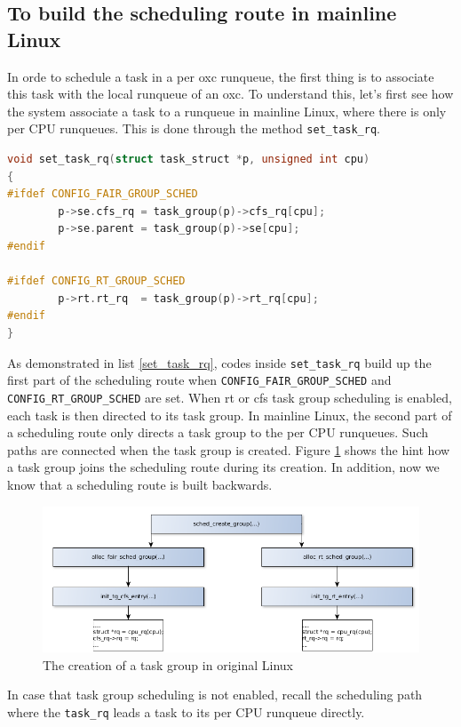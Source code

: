 \subsection{To build the scheduling route in mainline Linux}
In orde to schedule a task in a per oxc runqueue, the first thing is to 
associate this task with the local runqueue of an oxc. To understand this,
let's first see how the system associate a task to a runqueue in 
mainline Linux, where there is only per CPU runqueues. This is done through
the method \texttt{set\_task\_rq}.
\begin{lstlisting}[language=C, label={set_task_rq},
	caption={To associate tasks with a per CPU runqueue in mainline Linux}]
void set_task_rq(struct task_struct *p, unsigned int cpu)
{
#ifdef CONFIG_FAIR_GROUP_SCHED
        p->se.cfs_rq = task_group(p)->cfs_rq[cpu];
        p->se.parent = task_group(p)->se[cpu];
#endif

#ifdef CONFIG_RT_GROUP_SCHED
        p->rt.rt_rq  = task_group(p)->rt_rq[cpu];
#endif
}
\end{lstlisting}
As demonstrated in list \ref{set_task_rq}, codes inside \texttt{set\_task\_rq}
build up the first part of the scheduling route 
when \texttt{CONFIG\_FAIR\_GROUP\_SCHED} and 
\texttt{CONFIG\_RT\_GROUP\_SCHED} are set.
When rt or cfs task group scheduling is enabled, each task is then directed 
to its task group. In mainline Linux, the second part of a scheduling route
only directs a task group to the per CPU runqueues. Such paths are connected 
when the task group is created. Figure \ref{fig:tg_creation} shows the hint how 
a task group joins the scheduling route during its creation. In addition, now 
we know that a scheduling route is built backwards.
\begin{figure}[htbp]
        \centering
        \includegraphics[width=\textwidth]{images/tg_creation}
        \caption{The creation of a task group in original Linux}
        \label{fig:tg_creation}
\end{figure}
In case that task group scheduling is not enabled, recall the scheduling path
where the \texttt{task\_rq} leads a task to its per CPU runqueue directly.

